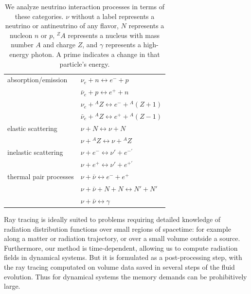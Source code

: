 \documentclass[aps,floatfix,prd,superscriptaddress,twocolumn]{revtex4-1}
\begin{document}
\begin{table}%
  \caption{
    We analyze neutrino interaction processes in terms of these categories.
    $\nu$ without a label represents a neutrino or antineutrino of any flavor,
    $N$ represents a nucleon $n$ or $p$,
    ${}^ZA$ represents a nucleus with mass number $A$ and charge $Z$, and
    $\gamma$ represents a high-energy photon.
    A prime indicates a change in that particle's energy.
  }
  \label{tab:neutrino_processes}
  \begin{tabularx}{\columnwidth}{X X}
    \hline \hline
    absorption/emission
    & $\nu_e + n \leftrightarrow e^- + p$                          \\
    & $\bar{\nu}_e + p \leftrightarrow e^+ + n$                    \\
    & $\nu_e + {}^AZ \leftrightarrow e^- + {}^A(Z+1)$              \\
    & $\bar{\nu}_e + {}^AZ \leftrightarrow e^+ + {}^A(Z-1)$        \\
    \hline
    elastic scattering
    & $\nu + N \leftrightarrow \nu + N$                            \\
    & $\nu + {}^AZ \leftrightarrow \nu + {}^AZ$                    \\
    \hline
    inelastic scattering
    & $\nu + e^- \leftrightarrow \nu' + e^{-'}$                    \\
    & $\nu + e^+ \leftrightarrow \nu' + e^{+'}$                    \\
    \hline
    thermal pair processes
    & $\nu + \bar{\nu} \leftrightarrow e^{-} + e^{+}$              \\
    & $\nu + \bar{\nu} + N + N \leftrightarrow N' + N'$            \\
    & $\nu + \bar{\nu} \leftrightarrow \gamma$                     \\
    \hline \hline
  \end{tabularx}
\end{table}

Ray tracing is ideally suited to problems requiring detailed knowledge of
radiation distribution functions over small regions of spacetime:
for example along a matter or radiation trajectory,
or over a small volume outside a source.
Furthermore, our method is time-dependent, allowing us to compute radiation
fields in dynamical systems. But it is formulated as a post-processing step,
with the ray tracing computated on volume data saved in several steps
of the fluid evolution.
Thus for dynamical systems the memory demands can be prohibitively large.
\end{document}
